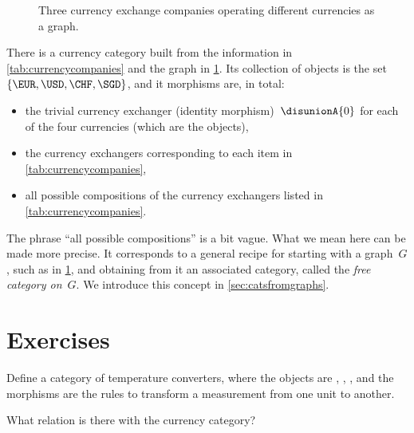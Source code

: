 \begin{figure}[h]
  \begin{center}
  \end{center}
  \caption{Three currency exchange companies operating different currencies as a graph. }
  \label{fig:currencygraph}
\end{figure}

There is a currency category built from the information in \cref{tab:currencycompanies} and the graph in \cref{fig:currencygraph}. Its collection of objects is the set $\{  \EUR, \USD, \CHF, \SGD \}$, and it morphisms are, in total:
\begin{itemize}
  \item the trivial currency exchanger (identity morphism)~$\disunionA{0}$ for each of the four currencies (which are the objects),
  \item the currency exchangers corresponding to each item in \cref{tab:currencycompanies},
  \item all possible compositions of the currency exchangers listed in \cref{tab:currencycompanies}.
\end{itemize}

The phrase ``all possible compositions'' is a bit vague. What we mean here can be made more precise. It corresponds to a general recipe for starting with a graph~$G$, such as in \cref{fig:currencygraph}, and obtaining from it an associated category, called the \emph{free category on}~$G$. We introduce this concept in \cref{sec:catsfromgraphs}.

\section{Exercises}
\begin{exercise}[Temperatures]
  Define a category of temperature converters, where the objects are
  , , , and the
  morphisms are the rules to transform a measurement from one unit to another.

  What relation is there with the currency category?

\end{exercise}
\begin{solution}
\end{solution}


